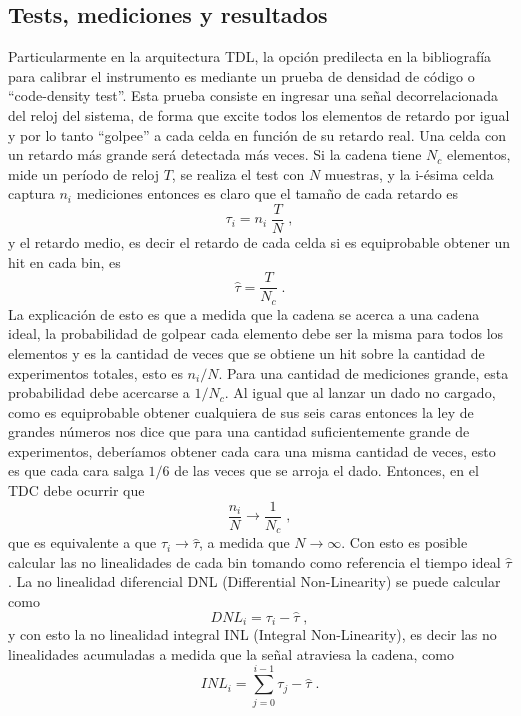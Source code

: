 \subsection{Tests, mediciones y resultados}
Particularmente en la arquitectura TDL, la opción predilecta en la bibliografía para calibrar el instrumento es mediante 
un prueba de densidad de código o ``code-density test''. Esta prueba consiste en ingresar una señal decorrelacionada del reloj del sistema, de forma que 
excite todos los elementos de retardo por igual y por lo tanto ``golpee'' a cada celda en función de su retardo real.
Una celda con un retardo más grande será detectada más veces. 
Si la cadena tiene $N_c$ elementos, mide un período de reloj $T$, se realiza el test con $N$ muestras,
y la i-ésima celda captura $n_i$ mediciones entonces es claro que el 
tamaño de cada retardo es
\begin{equation}
     \tau_i = n_i \; \dfrac{T}{N} \; ,
     \label{eq: tau_i}
\end{equation}
y el retardo medio, es decir el retardo de cada celda si es equiprobable obtener un hit 
en cada bin, es
\begin{equation}
     \hat{\tau} = \dfrac{T}{N_c} \; .
     \label{eq: tau_medio}
\end{equation}
La explicación de esto es que a medida que la cadena se acerca a una cadena ideal, la probabilidad de golpear cada
elemento debe ser la misma para todos los elementos y es la cantidad de veces que se obtiene un hit
sobre la cantidad de experimentos totales, esto es $n_i/N$. Para una cantidad de mediciones grande,
esta probabilidad debe acercarse a $1/N_c$. Al igual que al lanzar un dado no cargado, como es
equiprobable obtener cualquiera de sus seis caras entonces la ley de grandes números nos dice
que para una cantidad suficientemente grande de experimentos, deberíamos obtener cada cara una misma cantidad
de veces, esto es que cada cara salga $1/6$ de las veces que se arroja el dado.
Entonces, en el TDC debe ocurrir que 
\begin{equation*}
     \dfrac{n_i}{N} \longrightarrow \dfrac{1}{N_c} \; ,
\end{equation*}
que es equivalente a que $\tau_i \longrightarrow \hat{\tau}$, a medida que $N \rightarrow \infty$.
Con esto es posible calcular las no linealidades de cada bin tomando como referencia
el tiempo ideal $\hat{\tau}$. La no linealidad diferencial DNL (Differential Non-Linearity) 
se puede calcular como
\begin{equation}
     DNL_i = \tau_i - \hat{\tau} \; ,
     \label{eq: DNL}
\end{equation}
y con esto la no linealidad integral INL (Integral Non-Linearity), es decir las no linealidades acumuladas a medida que la 
señal atraviesa la cadena, como
\begin{equation}
     INL_i = \sum_{j=0}^{i-1} {\tau_j - \hat{\tau}} \; .
     \label{eq: INL}
\end{equation}

